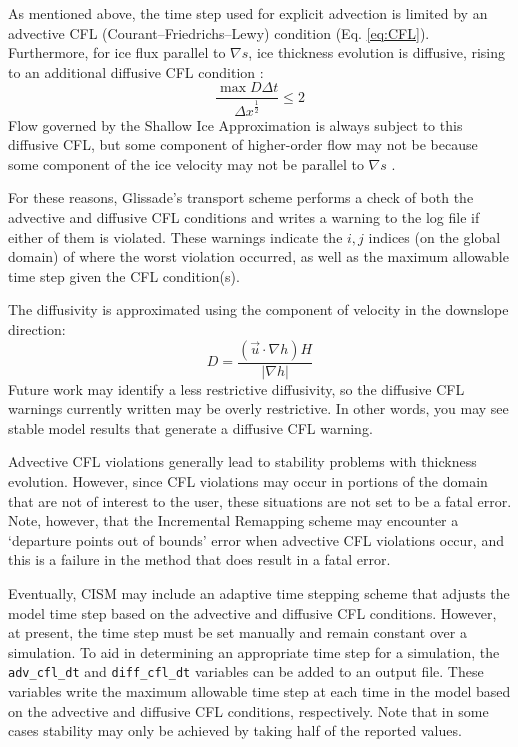 As mentioned above, the time step used for explicit advection is limited by an
advective CFL (Courant--Friedrichs--Lewy) condition (Eq. \ref{eq:CFL}).  
Furthermore, for ice flux parallel to $\nabla s$, ice thickness evolution is diffusive,
rising to an additional diffusive CFL condition \citep{Bueler:2009ee}:
\begin{equation}
    \frac{\max D \Delta t} { {\Delta x}^\frac{1}{2}} \leq 2 
\end{equation}
Flow governed by the Shallow Ice Approximation is always subject to this diffusive CFL,
but some component of higher-order flow may not be because some component of the ice
velocity may not be parallel to $\nabla s$ \citep{Bueler:2009ee}.

For these reasons, Glissade's transport scheme performs a check of both the
advective and diffusive CFL conditions and writes a warning to the log file if
either of them is violated.  These warnings indicate the $i,j$ indices (on the global domain)
of where the worst violation occurred, as well as the maximum allowable time step
given the CFL condition(s).

The diffusivity is approximated using the component of velocity in the downslope
direction:
\begin{equation}
  D = \frac{(\vec{u} \cdot \nabla h) H}{|\nabla h|}
\end{equation}
Future work may identify a less restrictive diffusivity, so the diffusive CFL 
warnings currently written may be overly restrictive.  In other words, you may see
stable model results that generate a diffusive CFL warning.  

Advective CFL violations generally lead to stability problems with 
thickness evolution.  However, since CFL violations may occur in portions of the
domain that are not of interest to the user, these situations are not set to be
a fatal error.  Note, however, that the Incremental Remapping scheme may encounter
a `departure points out of bounds' error when advective CFL violations occur, and this is a
failure in the method that does result in a fatal error.

Eventually, CISM may include an adaptive time stepping scheme that adjusts the 
model time step based on the advective and diffusive CFL conditions.  However, 
at present, the time step must be set manually and remain constant over a simulation.
To aid in determining an appropriate time step for a simulation, the \texttt{adv\_cfl\_dt}
and \texttt{diff\_cfl\_dt} variables can be added to an output file.  These variables
write the maximum allowable time step at each time in the model based on the 
advective and diffusive CFL conditions, respectively.  Note that in some cases 
stability may only be achieved by taking half of the reported values.



